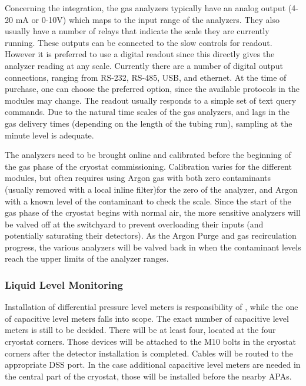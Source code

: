 Concerning the integration, the gas analyzers typically have an analog output (4-20 \si{mA} or 0-10\si{V}) which maps to the input range of the analyzers. They also usually have a number of relays that indicate the scale they are currently running. These outputs can be connected to the slow controls for readout. However it is preferred to use a digital readout since this directly gives the analyzer reading at any scale. Currently there are a number of digital output connections, ranging from RS-232, RS-485, USB, and ethernet. At the time of purchase, one can choose the preferred option, since the available protocols in the modules may change. The readout usually responds to a simple set of text query commands. Due to the natural time scales of the gas analyzers, and lags in the gas delivery times (depending on the length of the tubing run), sampling at the minute level is adequate.

The analyzers need to be brought online and calibrated before the beginning of the gas phase of the cryostat commissioning.  Calibration varies for the different modules, but often requires using Argon gas with both zero contaminants (usually removed with a local inline filter)for the zero of the analyzer, and Argon with a known level of the contaminant to check the scale. Since the start of the gas phase of the cryostat begins with normal air, the more sensitive analyzers will be valved off at the switchyard to prevent overloading their inputs (and potentially saturating their detectors). As the Argon Purge and gas recirculation progress, the various analyzers will be valved back in when the contaminant levels reach the upper limits of the analyzer ranges. 

\subsubsection{Liquid Level Monitoring}
\label{sec:fdgen-slow-cryo-install-llm}

Installation of differential pressure level meters is responsibility of , while the one of capacitive level meters falls into  scope. The exact number of capacitive level meters is still to be decided. There will be at least four, located at the four cryostat corners. 
Those devices will be attached to the M10 bolts in the cryostat corners after the detector installation is completed. Cables will be routed to the appropriate DSS port. In the case additional capacitive level meters are needed in the central part of the cryostat, those will be installed before the nearby APAs. 

